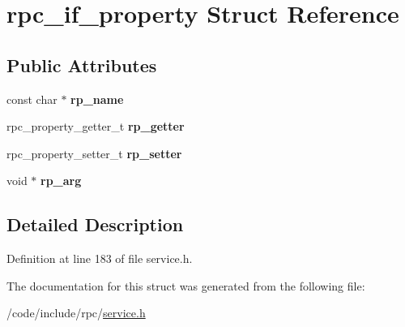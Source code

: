\hypertarget{structrpc__if__property}{}\section{rpc\+\_\+if\+\_\+property Struct Reference}
\label{structrpc__if__property}
\subsection*{Public Attributes}
\begin{DoxyCompactItemize}
\item 
const char $\ast$ {\bfseries rp\+\_\+name}\hypertarget{structrpc__if__property_a5482e72e7b9df03cba9e3b86a4aa162c}{}\label{structrpc__if__property_a5482e72e7b9df03cba9e3b86a4aa162c}

\item 
rpc\+\_\+property\+\_\+getter\+\_\+t {\bfseries rp\+\_\+getter}\hypertarget{structrpc__if__property_a6b88200bb991311dae3c05e92dc16fdc}{}\label{structrpc__if__property_a6b88200bb991311dae3c05e92dc16fdc}

\item 
rpc\+\_\+property\+\_\+setter\+\_\+t {\bfseries rp\+\_\+setter}\hypertarget{structrpc__if__property_ab095fba7efd97b90f3440c2db5369f1e}{}\label{structrpc__if__property_ab095fba7efd97b90f3440c2db5369f1e}

\item 
void $\ast$ {\bfseries rp\+\_\+arg}\hypertarget{structrpc__if__property_a0171db6c0ee6ad206634d42de210ae52}{}\label{structrpc__if__property_a0171db6c0ee6ad206634d42de210ae52}

\end{DoxyCompactItemize}


\subsection{Detailed Description}


Definition at line 183 of file service.\+h.



The documentation for this struct was generated from the following file\+:\begin{DoxyCompactItemize}
\item 
/code/include/rpc/\hyperlink{service_8h}{service.\+h}\end{DoxyCompactItemize}
